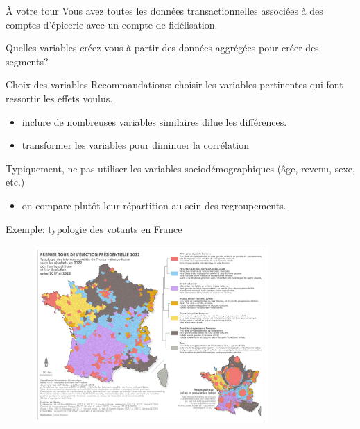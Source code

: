 \documentclass[
  ignorenonframetext,
]{beamer}
\providecommand{\tightlist}{%
  \setlength{\itemsep}{0pt}\setlength{\parskip}{0pt}}\usepackage{longtable,booktabs,array}
\begin{document}
\begin{frame}{À votre tour}
\protect\hypertarget{uxe0-votre-tour}{}
Vous avez toutes les données transactionnelles associées à des comptes
d'épicerie avec un compte de fidélisation.

Quelles variables créez vous à partir des données aggrégées pour créer
des segments?
\end{frame}

\begin{frame}{Choix des variables}
\protect\hypertarget{choix-des-variables}{}
Recommandations: choisir les variables pertinentes qui font ressortir
les effets voulus.

\begin{itemize}
\tightlist
\item
  inclure de nombreuses variables similaires dilue les différences.
\item
  transformer les variables pour diminuer la corrélation
\end{itemize}

Typiquement, ne pas utiliser les variables sociodémographiques (âge,
revenu, sexe, etc.)

\begin{itemize}
\tightlist
\item
  on compare plutôt leur répartition au sein des regroupements.
\end{itemize}
\end{frame}

\begin{frame}{Exemple: typologie des votants en France}
\protect\hypertarget{exemple-typologie-des-votants-en-france}{}
\begin{figure}

{\centering \includegraphics[width=0.8\textwidth,height=\textheight]{figures/typologie-vote-france.jpg}

}

\end{figure}
\end{frame}
\end{document}
